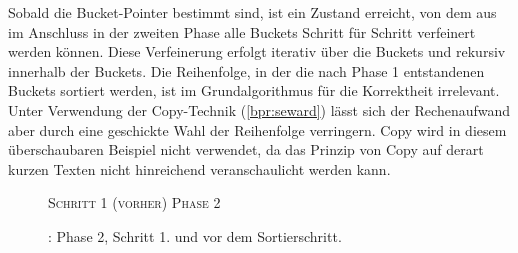 Sobald die Bucket-Pointer bestimmt sind, ist ein Zustand erreicht, von dem aus im Anschluss in der zweiten Phase alle Buckets Schritt für Schritt verfeinert werden können. Diese Verfeinerung erfolgt iterativ über die Buckets und rekursiv innerhalb der Buckets. Die Reihenfolge, in der die nach Phase 1 entstandenen Buckets sortiert werden, ist im Grundalgorithmus für die Korrektheit irrelevant. Unter Verwendung der Copy-Technik (\cref{bpr:seward}) lässt sich der Rechenaufwand aber durch eine geschickte Wahl der Reihenfolge verringern. Copy wird in diesem überschaubaren Beispiel nicht verwendet, da das Prinzip von Copy auf derart kurzen Texten nicht hinreichend veranschaulicht werden kann.\par
\begin{figure}[H]
    {\centering\begin{minipage}{\textwidth}
        {\large \textsc{Schritt 1 (vorher)}} \hfill {\Large \textsc{Phase 2}}\par\medskip
    \end{minipage}}
    \caption[\bpr: Phase 2, Schritt 1 (vorher)]{\bpr: Phase 2, Schritt 1. \sa und \bptr vor dem Sortierschritt.}
    \label{bpr:p2s1:1}
\end{figure}
